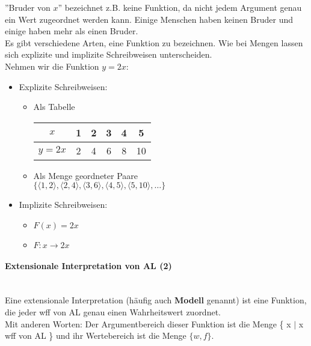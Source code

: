 \documentclass{scrartcl}
\begin{document}
''Bruder von $ x $'' bezeichnet z.B. keine Funktion, da nicht jedem Argument genau ein Wert zugeordnet werden kann. Einige Menschen haben keinen Bruder und einige haben mehr als einen Bruder. \\

Es gibt verschiedene Arten, eine Funktion zu bezeichnen. Wie bei Mengen lassen sich explizite und implizite Schreibweisen unterscheiden. \\

Nehmen wir die Funktion $ y = 2x $:

\begin{itemize}
	\item Explizite Schreibweisen:
	\begin{itemize}
		\item Als Tabelle \\
		\begin{tabular}{|c|c|c|c|c|c|}
			\hline 
			$ x $ & 1 & 2 & 3 & 4 & 5 \\ 
			\hline 
			$ y = 2x $ & 2 & 4 & 6 & 8 & 10 \\ 
			\hline 
		\end{tabular} 
		\item Als Menge geordneter Paare \\
		$ \{ \langle 1,2 \rangle, \langle 2,4 \rangle, \langle 3,6 \rangle, \langle 4,5 \rangle, \langle 5,10 \rangle, \ldots \} $
	\end{itemize}
	\item Implizite Schreibweisen:
	\begin{itemize}
		\item $ F(x) = 2x $
		\item $ F : x \rightarrow 2x $
	\end{itemize}
\end{itemize}

\paragraph{Extensionale Interpretation von AL (2)} \mbox{}\\

Eine extensionale Interpretation (häufig auch \textbf{Modell} genannt) ist eine Funktion, die jeder wff von AL genau einen Wahrheitswert zuordnet. \\

Mit anderen Worten: Der Argumentbereich dieser Funktion ist die Menge \{ x $ \mid $ x wff von AL \} und ihr Wertebereich ist die Menge $ \{ w,f \} $. \\
\end{document}

